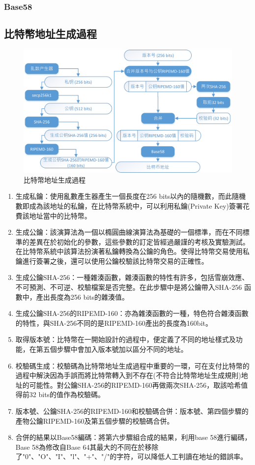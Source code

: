 			\subsubsection{Base58}

		\subsection{比特幣地址生成過程}

			\begin{figure}[h]
				\centering
				\includegraphics[width = .9\textwidth]{address.png}
				\caption{比特幣地址生成過程}\label{address}
			\end{figure}

		\begin{enumerate}
			\item 生成私鑰：使用亂數產生器產生一個長度在256 bits以內的隨機數，而此隨機數即成為該地址的私鑰，在比特幣系統中，可以利用私鑰(Private Key)簽署花費該地址當中的比特幣。
			\item 生成公鑰：該演算法為一個以橢圓曲線演算法為基礎的一個標準，而在不同標準的差異在於初始化的參數，這些參數的訂定皆經過嚴謹的考核及實驗測試。在比特幣系統中該算法扮演著私鑰轉換為公鑰的角色。使得比特幣交易使用私鑰進行簽署之後，還可以使用公鑰校驗該比特幣交易的正確性。
			\item 生成公鑰SHA-256：一種雜湊函數，雜湊函數的特性有許多，包括雪崩效應、不可預測、不可逆、校驗檔案是否完整。在此步驟中是將公鑰帶入SHA-256 函數中，產出長度為256 bits的雜湊值。
			\item 生成公鑰SHA-256的RIPEMD-160：亦為雜湊函數的一種，特色符合雜湊函數的特性，與SHA-256不同的是RIPEMD-160產出的長度為160bit。
			\item 取得版本號：比特幣在一開始設計的過程中，便定義了不同的地址樣式及功能，在第五個步驟中會加入版本號加以區分不同的地址。
			\item 校驗碼生成：校驗碼為比特幣地址生成過程中重要的一環，可在支付比特幣的過程中解決因為手誤而將比特幣轉入到不存在(不符合比特幣地址生成規則)地址的可能性。對公鑰SHA-256的RIPEMD-160再做兩次SHA-256，取該哈希值得前32 bits的值作為校驗碼。
			\item 版本號、公鑰SHA-256的RIPEMD-160和校驗碼合併：版本號、第四個步驟的產物公鑰RIPEMD-160及第五個步驟的校驗碼合併。
			\item 合併的結果以Base58編碼：將第六步驟組合成的結果，利用base 58進行編碼，Base 58為修改自Base 64其最大的不同在於移除了"0"、"O"、"I"、"l"、"+"、"/"的字符，可以降低人工判讀在地址的錯誤率。
		\end{enumerate}



